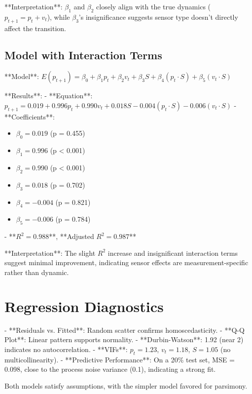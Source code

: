 \documentclass[12pt]{article}
\begin{document}
**Interpretation**: \( \beta_1 \) and \( \beta_2 \) closely align with the true dynamics (\( p_{t+1} = p_t + v_t \)), while \( \beta_3 \)’s insignificance suggests sensor type doesn’t directly affect the transition.

\subsection{Model with Interaction Terms}
\label{subsec:model_with_interaction_terms}

**Model**: \( E(p_{t+1}) = \beta_0 + \beta_1 p_t + \beta_2 v_t + \beta_3 S + \beta_4 (p_t \cdot S) + \beta_5 (v_t \cdot S) \)

**Results**:
- **Equation**: \( p_{t+1} = 0.019 + 0.996 p_t + 0.990 v_t + 0.018 S - 0.004 (p_t \cdot S) - 0.006 (v_t \cdot S) \)
- **Coefficients**:
  \begin{itemize}
    \item \( \beta_0 = 0.019 \) (p = 0.455)
    \item \( \beta_1 = 0.996 \) (p < 0.001)
    \item \( \beta_2 = 0.990 \) (p < 0.001)
    \item \( \beta_3 = 0.018 \) (p = 0.702)
    \item \( \beta_4 = -0.004 \) (p = 0.821)
    \item \( \beta_5 = -0.006 \) (p = 0.784)
  \end{itemize}
- **\( R^2 = 0.988 \)**, **Adjusted \( R^2 = 0.987 \)**

**Interpretation**: The slight \( R^2 \) increase and insignificant interaction terms suggest minimal improvement, indicating sensor effects are measurement-specific rather than dynamic.

\section{Regression Diagnostics}
\label{sec:regression_diagnostics}

- **Residuals vs. Fitted**: Random scatter confirms homoscedasticity.
- **Q-Q Plot**: Linear pattern supports normality.
- **Durbin-Watson**: 1.92 (near 2) indicates no autocorrelation.
- **VIFs**: \( p_t = 1.23 \), \( v_t = 1.18 \), \( S = 1.05 \) (no multicollinearity).
- **Predictive Performance**: On a 20\% test set, MSE = 0.098, close to the process noise variance (0.1), indicating a strong fit.

Both models satisfy assumptions, with the simpler model favored for parsimony.
\end{document}
